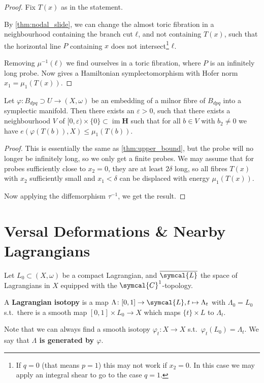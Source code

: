 \documentclass[12pt,a4paper,draft]{scrartcl}
\DeclareMathOperator{\im}{im}
\begin{document}
\begin{proof}
  Fix $T(x)$ as in the statement.
  
By \cref{thm:nodal_slide}, we can change the almost toric fibration in a neighbourhood containing the branch cut $ℓ$, and not containing $T(x)$, such that the horizontal line $P$ containing $x$ does not intersect\footnote{If $q=0$ (that means $p=1$) this may not work if $x_2=0$. In this case we may apply an integral shear to go to the case $q=1$.} $ℓ$.

Removing $μ^{-1}(ℓ)$ we find ourselves in a toric fibration, where $P$ is an infinitely long probe. Now \cite[Lemma 2.4]{mcduff2011displacing} gives a Hamiltonian symplectomorphism with Hofer norm $x_1 = μ_1(T(x))$.
\end{proof}

\begin{proposition}
\label{thm:upper_bound_embedded}
  Let $φ:B_{dpq} ⊃ U → (X,ω)$ be an embedding of a milnor fibre of $B_{dpq}$ into a symplectic manifold.
  Then there exists an $ε>0$, such that there exists a neighbourhood $V$ of $[0,ε) × \{0\} ⊂ \im{\symbf{H}}$ such that for all $b ∈ V$ with $b_2 ≠ 0$ we have $e(φ(T(b)),X) \leq μ_1(T(b))$.
\end{proposition}

\begin{proof}
    This is essentially the same as \cref{thm:upper_bound}, but the probe will no longer be infinitely long, so we only get a finite probes.
    We may assume that for probes sufficiently close to $x_2=0$, they are at least $2δ$ long, so all fibres $T(x)$ with $x_2$ sufficiently small and $x_1<δ$ can be displaced with energy $μ_1(T(x))$.

    Now applying the diffemorphism $τ^{-1}$, we get the result.
\end{proof}

\section{Versal Deformations \& Nearby Lagrangians}

Let $L_0 ⊂ (X,ω)$ be a compact Lagrangian, and $\overline{\symcal{L}}$ the space of Lagrangians in $X$ equipped with the $\symcal{C}^1$-topology.

\begin{definition}
  A \textbf{Lagrangian isotopy} is a map $\Lambda \colon [0,1] \rightarrow \symcal{L}, t \mapsto \Lambda_t$ with $\Lambda_0 = L_0$ s.t.\ there is a smooth map $[0,1] \times L_0 \rightarrow X$ which maps $\{t\} \times L$ to $\Lambda_t$.

  Note that we can always find a smooth isotopy $φ_t \colon X → X$ s.t.\ $φ_t(L_0) = Λ_t$. We say that \textbf{$Λ$ is generated by $φ$}.
\end{definition}
\end{document}
